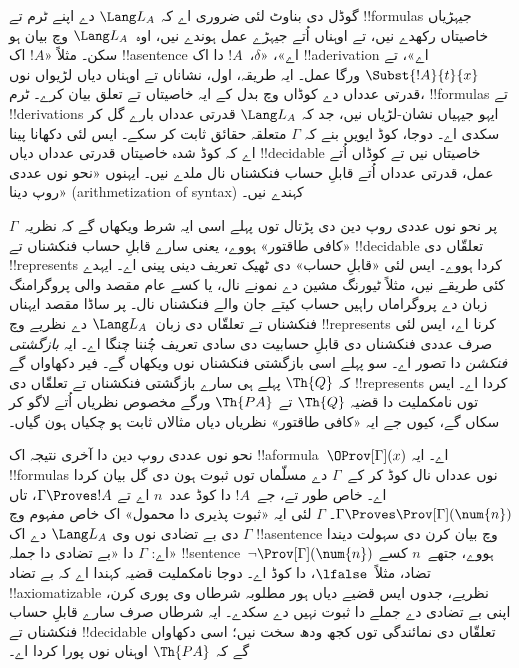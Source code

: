 \documentclass[../../../include/open-logic-section]{subfiles}
\begin{document}
گوڈل دی بناوٹ لئی ضروری اے کہ
$\Lang L_A$ دے اپنے ٹرم تے
!!{formula}s جیہڑیاں خاصیتاں رکھدے نیں، تے
اوہناں اُتے جیہڑے عمل ہوندے نیں، اوہ~$\Lang L_A$ وچ بیان ہو سکن۔
مثلاً «$!A$ اک !!a{sentence} اے»،
«$\delta$،~$!A$ دا اک !!a{derivation} اے»،
تے $\Subst{!A}{t}{x}$ ورگا عمل۔
ایہ طریقہ، اول، نشاناں تے اوہناں دیاں
لڑیواں نوں قدرتی عدداں دے کوڈاں وچ
بدل کے ایہ خاصیتاں تے تعلق بیان کرے۔
ٹرم، !!{formula}s تے !!{derivation}s
ایہو جیہیاں نشان-لڑیاں نیں، جد کہ
$\Lang L_A$ قدرتی عدداں بارے گل
کر سکدی اے۔ دوجا، کوڈ ایویں بنے کہ
$\Gamma$ متعلقہ حقائق ثابت کر سکے۔
ایس لئی دکھانا پینا اے کہ کوڈ شدہ
خاصیتاں قدرتی عدداں دیاں
!!{decidable} خاصیتاں نیں تے
کوڈاں اُتے عمل، قدرتی عدداں اُتے
قابلِ حساب فنکشناں نال ملدے نیں۔
ایہنوں «نحو نوں عددی روپ دینا»
(arithmetization of syntax) کہندے نیں۔

پر نحو نوں عددی روپ دین دی پڑتال
توں پہلے اسی ایہ شرط ویکھاں گے کہ
نظریہ~$\Gamma$ «کافی طاقتور» ہووے،
یعنی سارے قابلِ حساب فنکشناں تے
!!{decidable} تعلقّاں دی
!!{represents} کردا ہووے۔ ایس لئی
«قابلِ حساب» دی ٹھیک تعریف دینی
پینی اے۔ ایہدے کئی طریقے نیں، مثلاً
ٹیورنگ مشین دے نمونے نال، یا کسے
عام مقصد والی پروگرامنگ زبان دے
پروگراماں راہیں حساب کیتے جان والے
فنکشناں نال۔ پر ساڈا مقصد ایہناں
فنکشناں تے تعلقّاں دی زبان~$\Lang L_A$
دے نظریے وچ !!{represents} کرنا اے،
ایس لئی صرف عددی فنکشناں دی
قابلِ حسابیت دی سادی تعریف چُننا
چنگا اے۔ ایہ \emph{بازگشتی فنکشن}
دا تصور اے۔ سو پہلے اسی بازگشتی
فنکشناں نوں ویکھاں گے۔ فیر دکھاواں
گے کہ $\Th{Q}$ پہلے ہی سارے
بازگشتی فنکشناں تے تعلقّاں دی
!!{represents} کردا اے۔ ایس توں
نامکملیت دا قضیہ $\Th{Q}$ تے
$\Th{PA}$ ورگے مخصوص نظریاں
اُتے لاگو کر سکاں گے، کیوں جے
ایہ «کافی طاقتور» نظریاں دیاں
مثالاں ثابت ہو چکیاں ہون گیاں۔

نحو نوں عددی روپ دین دا آخری
نتیجہ اک !!a{formula}~$\OProv[\Gamma](x)$
اے۔ ایہ !!{formula}s نوں عدداں
نال کوڈ کر کے~$\Gamma$ دے مسلّماں
توں ثبوت ہون دی گل بیان کردا اے۔
خاص طور تے، جے~$!A$ دا کوڈ
عدد~$n$ اے تے $\Gamma \Proves
!A$، تاں $\Gamma \Proves
\Prov[\Gamma](\num{n})$۔
$\Gamma$ لئی ایہ «ثبوت پذیری
دا محمول» اک خاص مفہوم وچ
$\Gamma$ دی بے تضادی نوں وی
$\Lang L_A$ دے اک !!a{sentence}
وچ بیان کرن دی سہولت دیندا اے:
$\Gamma$ دا «بے تضادی دا جملہ»
!!{sentence}~$\lnot \Prov[\Gamma](\num{n})$
ہووے، جتھے~$n$ کسے تضاد،
مثلاً~$\lfalse$، دا کوڈ اے۔
دوجا نامکملیت قضیہ کہندا اے
کہ بے تضاد !!{axiomatizable}
نظریے، جدوں ایس قضیے دیاں
ہور مطلوبہ شرطاں وی پوری کرن،
اپنی بے تضادی دے جملے دا ثبوت
نہیں دے سکدے۔ ایہ شرطاں
صرف سارے قابلِ حساب فنکشناں
تے !!{decidable} تعلقّاں دی
نمائندگی توں کجھ ودھ سخت
نیں؛ اسی دکھاواں گے کہ
$\Th{PA}$ اوہناں نوں پورا
کردا اے۔
\end{document}
